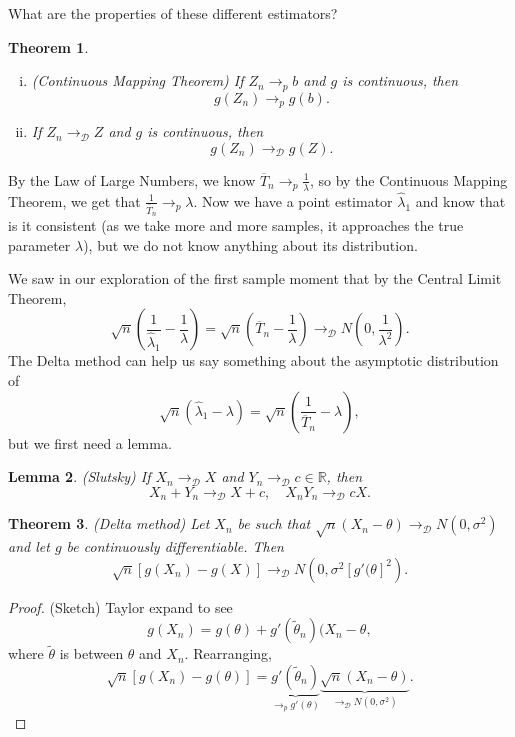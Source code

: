 \documentclass{tufte-handout}
\newcommand*\R{\mathbb{R}}
\newtheorem{thm}{Theorem}[subsection]
\newtheorem{lemma}[thm]{Lemma}
\theoremstyle{definition}
\begin{document}
What are the properties of these different estimators?

\begin{thm}
	\begin{enumerate}[(i)]
		\item (Continuous Mapping Theorem) If $Z_n \to_p b$ and $g$ is continuous, then \[
			g(Z_n) \to_p g(b)
		.\] 
		\item If $Z_n \to_{\mathscr{D}} Z$ and $g$ is continuous, then \[
			g(Z_n) \to_{\mathscr{D}} g(Z)
		.\]
	\end{enumerate}
\end{thm}

By the Law of Large Numbers, we know $\overline{T}_n \to_p \frac{1}{\lambda}$, so by the Continuous Mapping Theorem, we get that $\frac{1}{\overline{T}_n} \to_p \lambda$. Now we have a point estimator $\hat{\lambda}_1$ and know that is it consistent (as we take more and more samples, it approaches the true parameter $\lambda$), but we do not know anything about its distribution.

We saw in our exploration of the first sample moment that by the Central Limit Theorem, \[
	\sqrt{n} \left( \frac{1}{\hat{\lambda}_1} - \frac{1}{\lambda} \right) = \sqrt{n} \left( \overline{T}_n - \frac{1}{\lambda} \right) \to_{\mathscr{D}} N(0,\frac{1}{\lambda^2})
.\] The Delta method can help us say something about the asymptotic distribution of \[
	\sqrt{n} \left( \hat{\lambda}_1 - \lambda \right) = \sqrt{n} \left( \frac{1}{\overline{T}_n} - \lambda \right)
,\] but we first need a lemma.

\begin{lemma}
	(Slutsky) If $X_n \to_{\mathscr{D}} X$ and $Y_n \to_{\mathscr{D}} c \in \R$, then \[
		X_n + Y_n \to_{\mathscr{D}} X + c, \quad X_nY_n \to_{\mathscr{D}} cX
	.\] 
\end{lemma}

\begin{thm}
	(Delta method) Let $X_n$ be such that $\sqrt{n} \left( X_n - \theta \right) \to_{\mathscr{D}} N(0,\sigma^2)$ and let $g$ be continuously differentiable. Then \[
		\sqrt{n} \left[ g(X_n) - g(X) \right] \to_{\mathscr{D}} N\left( 0,\sigma^2 \left[ g'(\theta \right] ^2 \right)
	.\] 
\end{thm}
\begin{proof}
	(Sketch) Taylor expand to see \[
		g(X_n) = g(\theta) + g'(\tilde{\theta}_n)(X_n - \theta
	,\] where $\tilde{\theta} $ is between $\theta$ and $X_n$. Rearranging, \[
	\sqrt{n} \left[ g(X_n) - g(\theta) \right] = \underbrace{g'(\tilde{\theta}_n)}_{\to_p g'(\theta)} \underbrace{\sqrt{n} \left( X_n - \theta \right)}_{\to_{\mathscr{D}} N(0,\sigma^2)}  
	.\] 
\end{proof}
\end{document}
